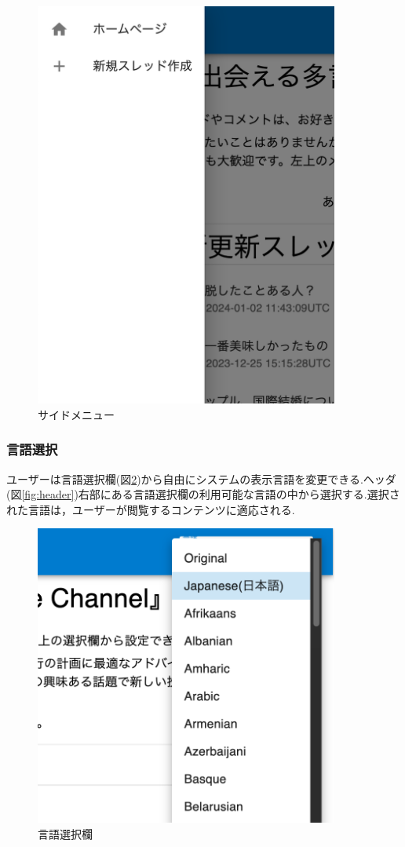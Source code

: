 \documentclass[b5paper,12pt,dvipdfmx]{jsreport}
\begin{document}
\begin{figure}[H]
	\centering
    \includegraphics[width=100mm,height=133.94mm]{./img/feature/side_menu.png}
	\caption{サイドメニュー}
	\label{fig:side_menu}
\end{figure}


\subsubsection{言語選択}
ユーザーは言語選択欄(図\ref{fig:language_select})から自由にシステムの表示言語を変更できる.ヘッダ(図\ref{fig:header})右部にある言語選択欄の利用可能な言語の中から選択する.選択された言語は，ユーザーが閲覧するコンテンツに適応される.

\begin{figure}[H]
	\centering
    \includegraphics[width=100mm,height=99.22mm]{./img/feature/language_select.png}
	\caption{言語選択欄}
	\label{fig:language_select}
\end{figure}
\end{document}
